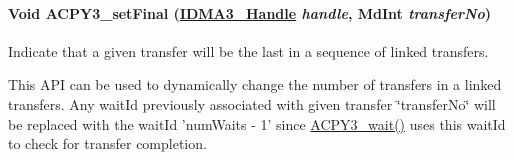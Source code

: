 \hypertarget{group___d_s_p_a_c_p_y3_gfc7ddb15d68ef3741abfb8843763fce5}{
\paragraph[ACPY3\_\-setFinal]{\setlength{\rightskip}{0pt plus 5cm}Void ACPY3\_\-set\-Final (\hyperlink{struct_i_d_m_a3___obj}{IDMA3\_\-Handle} {\em handle}, Md\-Int {\em transfer\-No})}\hfill}
\label{group___d_s_p_a_c_p_y3_gfc7ddb15d68ef3741abfb8843763fce5}


Indicate that a given transfer will be the last in a sequence of linked transfers. 

This API can be used to dynamically change the number of transfers in a linked transfers. Any wait\-Id previously associated with given transfer \char`\"{}transfer\-No\char`\"{} will be replaced with the wait\-Id 'num\-Waits - 1' since \hyperlink{group___d_s_p_a_c_p_y3_g499bc0643a52f5cfd0828c1ce21cd69b}{ACPY3\_\-wait()} uses this wait\-Id to check for transfer completion.

